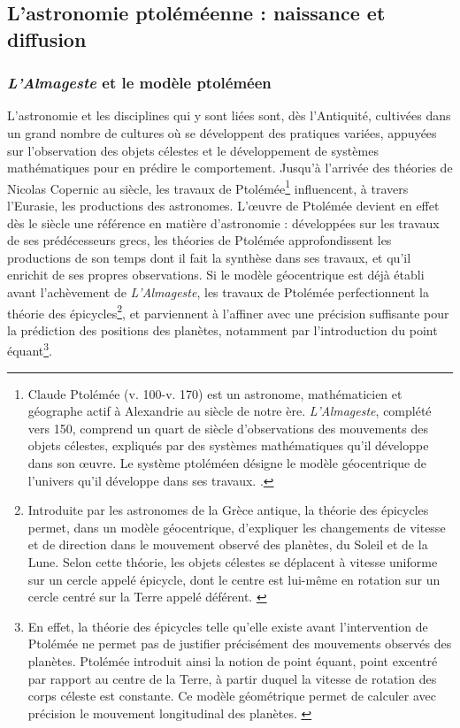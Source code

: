 
\subsection{L’astronomie ptoléméenne : naissance et diffusion}
    \subsubsection{\textit{L'Almageste} et le modèle ptoléméen}
L'astronomie et les disciplines qui y sont liées sont, dès l'Antiquité, cultivées dans un grand nombre de cultures où se développent des pratiques variées, appuyées sur l'observation des objets célestes et le développement de systèmes mathématiques pour en prédire le comportement. Jusqu'à l'arrivée des théories de Nicolas Copernic au \xv siècle, les travaux de Ptolémée\footnote{Claude Ptolémée (v. 100-v. 170) est un astronome, mathématicien et géographe actif à Alexandrie au \ii siècle de notre ère. \textit{L'Almageste}, complété vers 150, comprend un quart de siècle d'observations des mouvements des objets célestes, expliqués par des systèmes mathématiques qu'il développe dans son œuvre. Le système ptoléméen désigne le modèle géocentrique de l'univers qu'il développe dans ses travaux. \cite{jonesPtolemya}.} influencent, à travers l'Eurasie, les productions des astronomes. L'œuvre de Ptolémée devient en effet dès le \ii siècle une référence en matière d'astronomie : développées sur les travaux de ses prédécesseurs grecs, les théories de Ptolémée approfondissent les productions de son temps dont il fait la synthèse dans ses travaux, et qu'il enrichit de ses propres observations. Si le modèle géocentrique est déjà établi avant l'achèvement de \textit{L'Almageste}, les travaux de Ptolémée perfectionnent la théorie des épicycles\footnote{Introduite par les astronomes de la Grèce antique, la théorie des épicycles permet, dans un modèle géocentrique, d'expliquer les changements de vitesse et de direction dans le mouvement observé des planètes, du Soleil et de la Lune. Selon cette théorie, les objets célestes se déplacent à vitesse uniforme sur un cercle appelé épicycle, dont le centre est lui-même en rotation sur un cercle centré sur la Terre appelé déférent. \cite{rousseauEpicyclesPtolemee}}, et parviennent à l'affiner avec une précision suffisante pour la prédiction des positions des planètes, notamment par l'introduction du point équant\footnote{En effet, la théorie des épicycles telle qu'elle existe avant l'intervention de Ptolémée ne permet pas de justifier précisément des mouvements observés des planètes. Ptolémée introduit ainsi la notion de point équant, point excentré par rapport au centre de la Terre, à partir duquel la vitesse de rotation des corps céleste est constante. Ce modèle géométrique permet de calculer avec précision le mouvement longitudinal des planètes. \cite{evansHistoryAstronomy}}.

